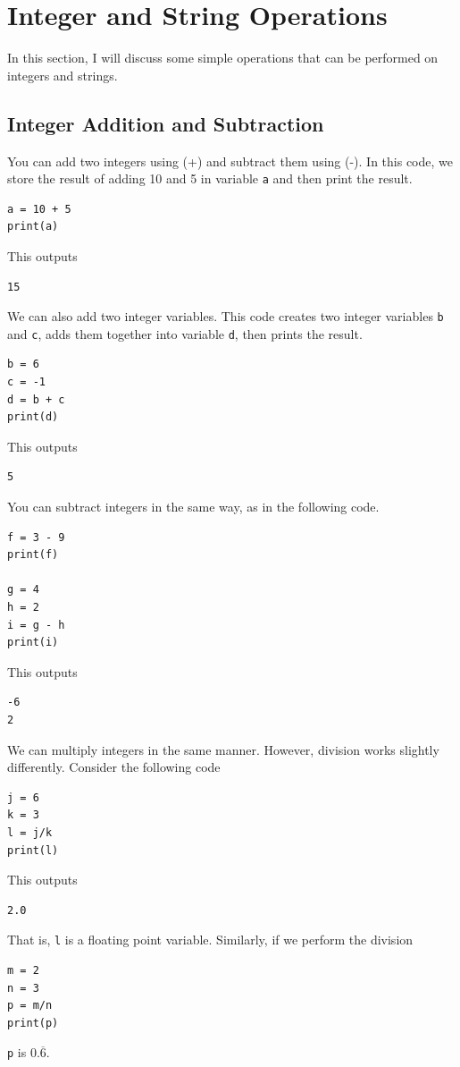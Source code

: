\documentclass{article}
\begin{document}
\newpage

\section{Integer and String Operations}
In this section, I will discuss some simple operations that can be performed on integers and strings.

\subsection{Integer Addition and Subtraction}
You can add two integers using (+) and subtract them using (-). In this code, we store the result of adding 10 and 5 in variable \texttt{a} and then print the result.
\begin{verbatim}
a = 10 + 5
print(a)
\end{verbatim}
This outputs
\begin{verbatim}
15
\end{verbatim}
We can also add two integer variables. This code creates two integer variables \texttt{b} and \texttt{c}, adds them together into variable \texttt{d}, then prints the result.
\begin{verbatim}
b = 6
c = -1
d = b + c
print(d)
\end{verbatim}
This outputs
\begin{verbatim}
5
\end{verbatim}
You can subtract integers in the same way, as in the following code.
\begin{verbatim}
f = 3 - 9
print(f)

g = 4
h = 2
i = g - h
print(i)
\end{verbatim}
This outputs
\begin{verbatim}
-6
2
\end{verbatim}
We can multiply integers in the same manner. However, division works slightly differently. Consider the following code
\begin{verbatim}
j = 6
k = 3
l = j/k
print(l)
\end{verbatim}
This outputs
\begin{verbatim}
2.0
\end{verbatim}
That is, \texttt{l} is a floating point variable. Similarly, if we perform the division
\begin{verbatim}
m = 2
n = 3
p = m/n
print(p)
\end{verbatim}
\texttt{p} is $0.\overline{6}$.
\end{document}
